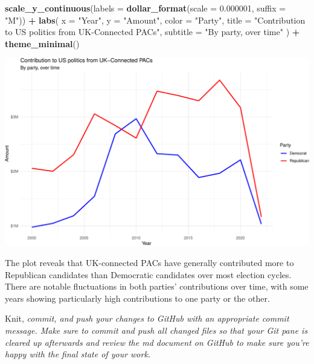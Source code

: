 \documentclass[
]{article}
\newenvironment{Shaded}{\begin{snugshade}}{\end{snugshade}}
\newcommand{\AttributeTok}[1]{\textcolor[rgb]{0.13,0.29,0.53}{#1}}
\newcommand{\FloatTok}[1]{\textcolor[rgb]{0.00,0.00,0.81}{#1}}
\newcommand{\FunctionTok}[1]{\textcolor[rgb]{0.13,0.29,0.53}{\textbf{#1}}}
\newcommand{\NormalTok}[1]{#1}
\newcommand{\SpecialCharTok}[1]{\textcolor[rgb]{0.81,0.36,0.00}{\textbf{#1}}}
\newcommand{\StringTok}[1]{\textcolor[rgb]{0.31,0.60,0.02}{#1}}
\begin{document}
\begin{Shaded}
\begin{Highlighting}[]
  \FunctionTok{scale\_y\_continuous}\NormalTok{(}\AttributeTok{labels =} \FunctionTok{dollar\_format}\NormalTok{(}\AttributeTok{scale =} \FloatTok{0.000001}\NormalTok{, }\AttributeTok{suffix =} \StringTok{"M"}\NormalTok{)) }\SpecialCharTok{+}
  \FunctionTok{labs}\NormalTok{(}
    \AttributeTok{x =} \StringTok{"Year"}\NormalTok{,}
    \AttributeTok{y =} \StringTok{"Amount"}\NormalTok{,}
    \AttributeTok{color =} \StringTok{"Party"}\NormalTok{,}
    \AttributeTok{title =} \StringTok{"Contribution to US politics from UK{-}Connected PACs"}\NormalTok{,}
    \AttributeTok{subtitle =} \StringTok{"By party, over time"}
\NormalTok{  ) }\SpecialCharTok{+}
  \FunctionTok{theme\_minimal}\NormalTok{()}
\end{Highlighting}
\end{Shaded}

\includegraphics[width=0.8\linewidth]{hw-06-money-in-politics_files/figure-latex/uk-party-contributions-1}

The plot reveals that UK-connected PACs have generally contributed more
to Republican candidates than Democratic candidates over most election
cycles. There are notable fluctuations in both parties' contributions
over time, with some years showing particularly high contributions to
one party or the other.

Knit, \emph{commit, and push your changes to GitHub with an appropriate
commit message. Make sure to commit and push all changed files so that
your Git pane is cleared up afterwards and review the md document on
GitHub to make sure you're happy with the final state of your work.}
\end{document}
